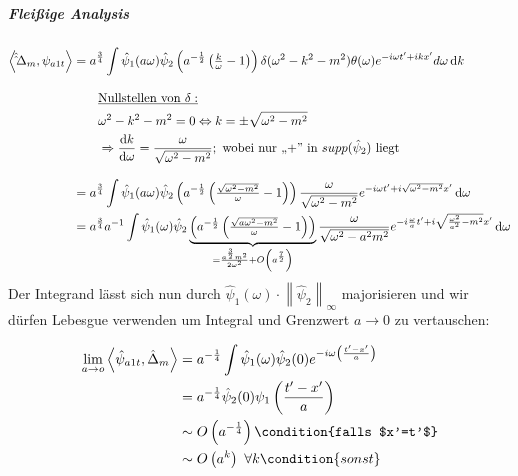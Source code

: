 \subparagraph*{Fleißige Analysis}
\begin{align}
    \left<\hat \hat \Delta_m, \psi_{a1t}\right> &=
        a^{\frac{3}{4}} \int \hat \psi_1(a\omega)
        \hat\psi_2\left(a^{-\frac{1}{2}} \left(\tfrac{k}{\omega}-1\right)\right)
        \delta (\omega^2 - k^2 - m^2) \theta(\omega)
        e^{-i\omega t' + ikx'} d \omega \mathop{}\!\mathrm{d} k \nonumber \\[2ex]
        & \kern 2em \underline{\textrm{Nullstellen von $\delta$}:}
        \nonumber \\
        & \kern 2em \omega^2 - k^2 - m^2 = 0 \Leftrightarrow k = \pm \sqrt{\omega^2-m^2}
        \nonumber \\
        & \kern 2em \Rightarrow \frac{\mathop{}\!\mathrm{d} k}{\mathop{}\!\mathrm{d} \omega} = \frac{\omega}{\sqrt{\omega^2-m^2}}; \textrm{   wobei nur ,,+'' in $supp (\hat \psi_2)$ liegt}
        \nonumber \\[2ex]
        &= a^{\frac{3}{4}} \int \hat\psi_1(a \omega)
        \hat\psi_2\left(a^{-\frac{1}{2}} \left(\tfrac{\sqrt{\omega^2-m^2}}{\omega}-1\right)\right)
        \frac{\omega}{\sqrt{\omega^2-m^2}}
        e^{-i\omega t' + i \sqrt{\omega^2-m^2}x'}
        \mathop{}\!\mathrm{d} \omega \nonumber \\
        &= a^{\frac{3}{4}} a^{-1} \int \hat\psi_1(\omega)
        \hat\psi_2
        \underbrace{
        \left(
            a^{-\frac{1}{2}} \left(\tfrac{\sqrt{a\omega^2-m^2}}{\omega}-1\right)
        \right)}_{= \frac{a^{\frac{3}{2}}m^2}{2 \omega^2}
                  + O\left(a^{\frac{7}{2}}\right)}
        \frac{\omega}{\sqrt{\omega^2-a^2 m^2}}
        e^{-i\frac{\omega}{a} t' + i \sqrt{\frac{\omega^2}{a^2}-m^2}x'}
        \mathop{}\!\mathrm{d} \omega \nonumber
\end{align}
Der Integrand lässt sich nun durch $\hat \psi_1(\omega) \cdot \left\lVert \hat\psi_2\right\lVert_\infty$ majorisieren und wir dürfen Lebesgue verwenden um Integral und Grenzwert $a \rightarrow 0$ zu vertauschen:

\begin{align}
\lim_{a \to o}
\left\langle\hat \psi_{a1t} ,\hat \Delta_m\right\rangle
&=
a^{-\frac{1}{4}} \int \hat \psi_1(\omega) \hat \psi_2 (0)
    e^{-i\omega \left(\frac{t'-x'}{a}\right)} \nonumber
\\ \nonumber &=
a^{-\frac{1}{4}} \hat \psi_2 (0) \psi_1\left(\frac{t'-x'}{a}\right)
\\ \nonumber &\sim
O\left(a^{-\frac{1}{4}}\right) \condition{falls $x'=t'$}
\\ &\sim O
\left(a^k\right) ~ \forall k  \condition{sonst}
\label{eq:delta_m_s=1}
\end{align}


